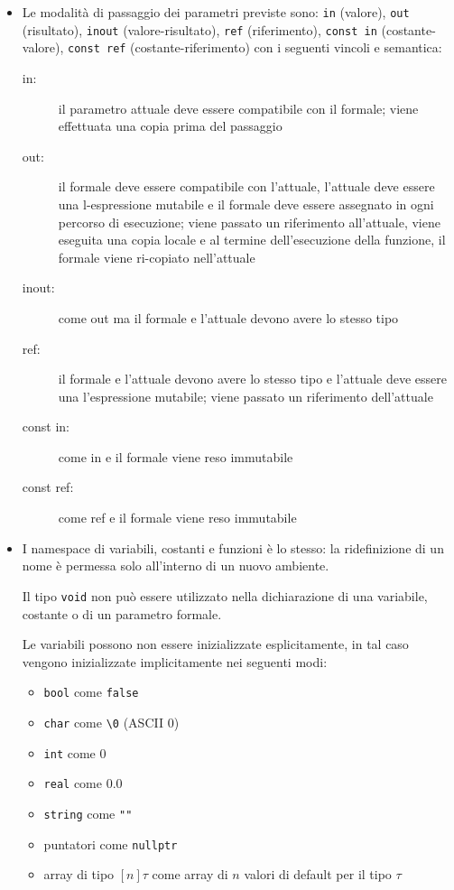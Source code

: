 \documentclass{report}
\newcommand{\term}[1]{\texttt{#1}}
\begin{document}
\begin {itemize}
    Le guardie di costrutti di iterazione indeterminata e condizionali deve avere tipo \term{bool}

    \item Le modalità di passaggio dei parametri previste sono: \term{in} (valore),
    \term{out} (risultato), \term{inout} (valore-risultato), \term{ref} (riferimento),
    \term{const in} (costante-valore), \term{const ref} (costante-riferimento) con i
    seguenti vincoli e semantica:
    \begin{description}
        \item[in:] il parametro attuale deve essere compatibile con il formale;
            viene effettuata una copia prima del passaggio
        \item[out:] il formale deve essere compatibile con l'attuale, l'attuale
            deve essere una l-espressione mutabile e il formale deve essere assegnato
            in ogni percorso di esecuzione; viene passato un riferimento all'attuale,
            viene eseguita una copia locale e al termine dell'esecuzione della funzione,
            il formale viene ri-copiato nell'attuale
        \item[inout:] come out ma il formale e l'attuale devono avere lo stesso tipo
        \item[ref:] il formale e l'attuale devono avere lo stesso tipo e l'attuale deve
            essere una l'espressione mutabile; viene passato un riferimento dell'attuale
        \item[const in:] come in e il formale viene reso immutabile
        \item[const ref:] come ref e il formale viene reso immutabile

    \end{description}

    \item I namespace di variabili, costanti e funzioni è lo stesso: la ridefinizione di un nome
    è permessa solo all'interno di un nuovo ambiente.

    Il tipo \term{void} non può essere utilizzato nella dichiarazione di una variabile,
    costante o di un parametro formale.

    Le variabili possono non essere inizializzate esplicitamente, in tal caso
    vengono inizializzate implicitamente nei seguenti modi:
    \begin{itemize}
        \item \term{bool} come \term{false}
        \item \term{char} come \texttt{\textbackslash 0} (ASCII 0)
        \item \term{int} come 0
        \item \term{real} come 0.0
        \item \term{string} come \term{""}
        \item puntatori come \term{nullptr}
        \item array di tipo $[n]\tau$ come array di $n$ valori di default
            per il tipo $\tau$
        

\end{itemize}
\end{itemize}
\end{document}
